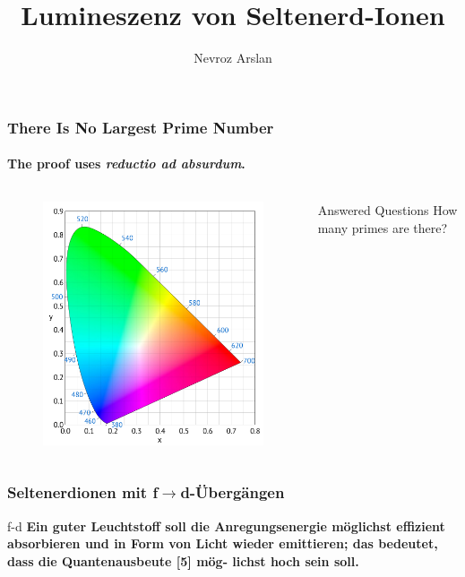 \documentclass{beamer}
\title{Lumineszenz von Seltenerd-Ionen}
\author{Nevroz Arslan}
\begin{document}
  {%
    \frame{\titlepage}
  }

  \begin{frame}
\frametitle{There Is No Largest Prime Number}
\framesubtitle{The proof uses \textit{reductio ad absurdum}.}
    \begin{columns}
               
       \begin{figure}[!htbp]
          \centering
          \includegraphics[width=\textwidth]{farbindex.png}
        \end{figure}
       
            \begin{block}{Answered Questions}
          How many primes are there?
          \end{block}
      \end{columns}

  \end{frame}
  
\begin{frame}[t]\frametitle{ Seltenerdionen mit f$\rightarrow$d-Übergängen}
 \begin{beamerboxesrounded}[lower=block body,shadow=false]{f-d}
   \textbf{ Ein guter Leuchtstoff soll die Anregungsenergie möglichst effizient absorbieren und in Form von Licht wieder
   emittieren; das bedeutet, dass die Quantenausbeute [5] mög-
   lichst hoch sein soll.}
    \end{beamerboxesrounded}   

\end{frame}
\end{document}
